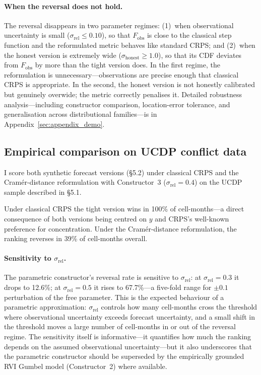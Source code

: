 \paragraph{When the reversal does not hold.}
The reversal disappears in two parameter regimes: (1)~when observational uncertainty is small ($\sigma_\text{rel} \leq 0.10$), so that $F_\text{obs}$ is close to the classical step function and the reformulated metric behaves like standard CRPS; and (2)~when the honest version is extremely wide ($\sigma_\text{honest} \geq 1.0$), so that its CDF deviates from $F_\text{obs}$ by more than the tight version does. In the first regime, the reformulation is unnecessary---observations are precise enough that classical CRPS is appropriate. In the second, the honest version is not honestly calibrated but genuinely overwide; the metric correctly penalises it. Detailed robustness analysis---including constructor comparison, location-error tolerance, and generalisation across distributional families---is in Appendix~\ref{sec:appendix_demo}.

\subsection{Empirical comparison on UCDP conflict data}

I score both synthetic forecast versions (\S5.2) under classical CRPS and the Cram\'er-distance reformulation with Constructor~3 ($\sigma_\text{rel} = 0.4$) on the UCDP sample described in \S5.1.

Under classical CRPS the tight version wins in 100\% of cell-months---a direct consequence of both versions being centred on $y$ and CRPS's well-known preference for concentration. Under the Cram\'er-distance reformulation, the ranking reverses in 39\% of cell-months overall.

\paragraph{Sensitivity to $\sigma_\text{rel}$.}
The parametric constructor's reversal rate is sensitive to $\sigma_\text{rel}$: at $\sigma_\text{rel} = 0.3$ it drops to 12.6\%; at $\sigma_\text{rel} = 0.5$ it rises to 67.7\%---a five-fold range for $\pm 0.1$ perturbation of the free parameter. This is the expected behaviour of a parametric approximation: $\sigma_\text{rel}$ controls how many cell-months cross the threshold where observational uncertainty exceeds forecast uncertainty, and a small shift in the threshold moves a large number of cell-months in or out of the reversal regime. The sensitivity itself is informative---it quantifies how much the ranking depends on the assumed observational uncertainty---but it also underscores that the parametric constructor should be superseded by the empirically grounded RVI Gumbel model (Constructor~2) where available.

